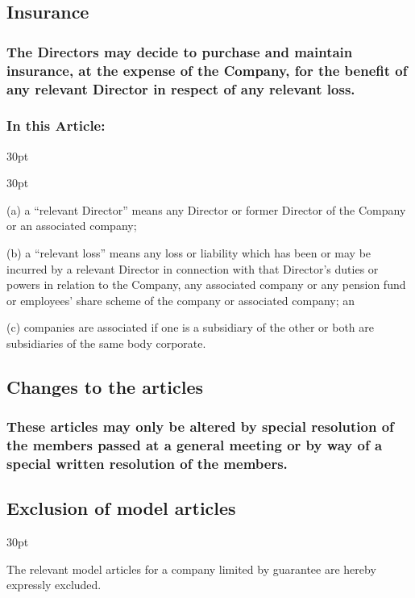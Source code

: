\documentclass[12pt]{article}
\def\clauseindent{30pt}
\newenvironment{subindentpara}{\begin{adjustwidth}{\clauseindent}{}\begin{hanginglist}}{\end{hanginglist}\end{adjustwidth}}
\newenvironment{subindentlist}{\begin{adjustwidth}{\clauseindent}{}\begin{labeledlist}{\clauseindent}}{\end{labeledlist}\end{adjustwidth}}
\begin{document}
\subsection{Insurance}
\subsubsection{The Directors may decide to purchase and maintain insurance, at the expense of the Company, for the benefit of any relevant Director in respect of any relevant loss.}
\subsubsection{In this Article:}
\begin{subindentlist}
    \item [(a)] a “relevant Director” means any Director or former Director of the Company or an associated company;
    \item [(b)] a “relevant loss” means any loss or liability which has been or may be incurred by a relevant Director in connection with that Director’s duties or powers in relation to the Company, any associated company or any pension fund or employees’ share scheme of the company or associated company; an
    \item [(c)] companies are associated if one is a subsidiary of the other or both are subsidiaries of the same body corporate.
\end{subindentlist}

\subsection{Changes to the articles}
\subsubsection{These articles may only be altered by special resolution of the members passed at a general meeting or by way of a special written resolution of the members.}

\subsection{Exclusion of model articles}
\begin{subindentpara}
    \item The relevant model articles for a company limited by guarantee are hereby expressly excluded.
\end{subindentpara}
\end{document}
